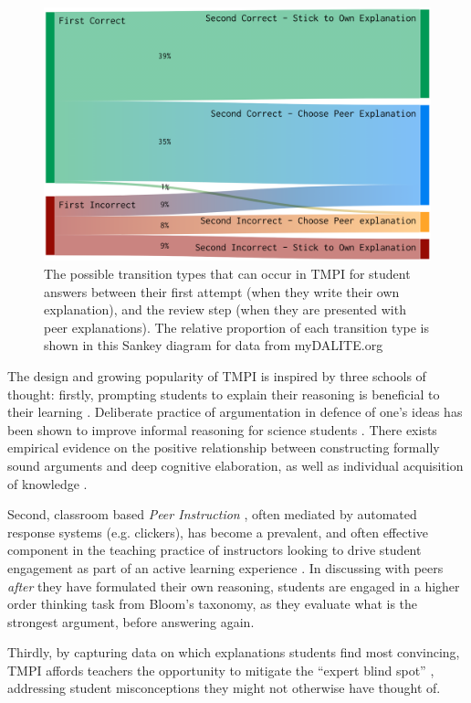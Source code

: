 \documentclass[notitlepage,12pt]{jedm}
\begin{document}
\begin{figure}[H]
	\centering
	\includegraphics[width=0.6\linewidth]{img/transitions_final.png}
	\caption{The possible transition types that can occur in TMPI for student 
	answers between their first attempt (when they write their own 
	explanation), and the review step (when they are presented with peer 
	explanations). 
	The relative proportion of each transition type is shown in this Sankey 
	diagram for data from myDALITE.org}
	\label{fig:tmpi_sankey}
\end{figure}


The design and growing popularity of TMPI is inspired by three schools of 
thought: firstly, prompting students to explain their reasoning is beneficial 
to their learning \cite{chi_eliciting_1994}. 
Deliberate practice of argumentation in defence of one's ideas has been shown 
to improve informal reasoning for science students \cite{venville_impact_2010}.
There exists empirical evidence on the positive relationship between 
constructing formally sound arguments and deep cognitive elaboration, as well 
as individual acquisition of knowledge \cite{stegmann_collaborative_2012}.

Second, classroom based \textit{Peer Instruction} \cite{crouch_peer_2001}, 
often mediated by automated response systems (e.g. clickers), has become a 
prevalent, and often effective component in the teaching practice of 
instructors looking to drive student engagement as part of an active learning 
experience \cite{charles_beyond_2015}. 
In discussing with peers \textit{after} they have formulated their own 
reasoning, students are engaged in a higher order thinking task from Bloom's 
taxonomy, as they evaluate what is the strongest argument, before answering 
again.

Thirdly, by capturing data on which explanations students find most convincing, 
TMPI affords teachers the opportunity to mitigate the ``expert blind spot'' 
\cite{nathan_expert_2001}, addressing student misconceptions they might not 
otherwise have thought of.
\end{document}
